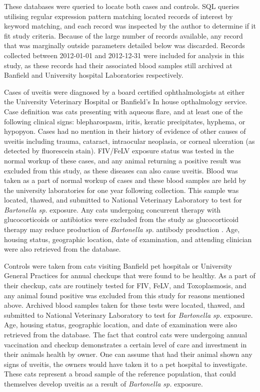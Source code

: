 \documentclass[11pt,twocolumn]{article}
\begin{document}
	These databases were queried to locate both cases and controls. SQL queries utilising regular expression pattern matching located records of interest by keyword matching, and each record was inspected by the author to determine if it fit study criteria. Because of the large number of records available, any record that was marginally outside parameters detailed below was discarded.
	Records collected between 2012-01-01 and 2012-12-31 were included for analysis in this study, as these records had their associated blood samples still archived at Banfield and University hospital Laboratories respectively.


	Cases of uveitis were diagnosed by a board certified ophthalmologists at either the University Veterinary Hospital or Banfield's In house opthalmology service.
	Case definition was cats presenting with aqueous flare, and at least one of the following clinical signs: blepharospasm, iritis, keratic precipitates, hyphema, or hypopyon. 
	Cases had no mention in their history of evidence of other causes of uveitis including trauma, cataract, intraocular neoplasia, or corneal ulceration (as detected by fluorescein stain). 
	FIV/FeLV exposure status was tested in the normal workup of these cases, and any animal returning a positive result was excluded from this study, as these diseases can also cause uveitis. 
	Blood was taken as a part of normal workup of cases and these blood samples are held by the university laboratories for one year following collection. This sample was located, thawed, and submitted to National Veterinary Laboratory \cite{febart} to test for \emph{Bartonella sp.} exposure.
	Any cats undergoing concurrent therapy with glucocorticoids or antibiotics were excluded from the study as glucocorticoid therapy may reduce production of \emph{Bartonella sp.} antibody production \cite{Lappin2000}.
	Age, housing status, geographic location, date of examination, and attending clinician  were also retrieved from the database. 



	Controls were taken from cats visiting Banfield pet hospitals or University General Practices for annual checkups that were found to be healthy. 
	As a part of their checkup, cats are routinely tested for FIV, FeLV, and Toxoplasmosis, and any animal found positive was excluded from this study for reasons mentioned above. 
	Archived blood samples taken for these tests were located, thawed, and submitted to National Veterinary Laboratory to test for \emph{Bartonella sp.} exposure.
	Age, housing status, geographic location, and date of examination were also retrieved from the database. 
		The fact that control cats were undergoing annual vaccination and checkup demonstrates a certain level of care and investment in their animals health by owner. One can assume that had their animal shown any signs of uveitis, the owners would have taken it to a pet hospital to investigate.
	These cats represent a broad sample of the reference population, that could themselves develop uveitis as a result of \emph{Bartonella sp.} exposure.
\end{document}
